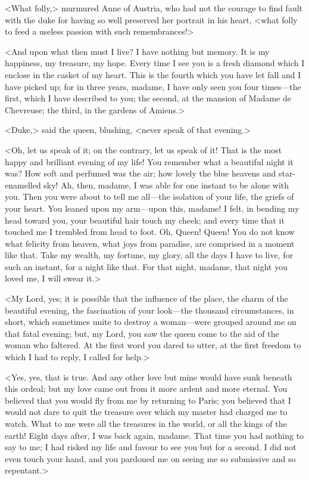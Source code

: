 <What folly,> murmured Anne of Austria, who had not the courage to find fault with the duke for having so well preserved her portrait in his heart, <what folly to feed a useless passion with such remembrances!> 

<And upon what then must I live? I have nothing but memory. It is my happiness, my treasure, my hope. Every time I see you is a fresh diamond which I enclose in the casket of my heart. This is the fourth which you have let fall and I have picked up; for in three years, madame, I have only seen you four times---the first, which I have described to you; the second, at the mansion of Madame de Chevreuse; the third, in the gardens of Amiens.> 

<Duke,> said the queen, blushing, <never speak of that evening.> 

<Oh, let us speak of it; on the contrary, let us speak of it! That is the most happy and brilliant evening of my life! You remember what a beautiful night it was? How soft and perfumed was the air; how lovely the blue heavens and star-enamelled sky! Ah, then, madame, I was able for one instant to be alone with you. Then you were about to tell me all---the isolation of your life, the griefs of your heart. You leaned upon my arm---upon this, madame! I felt, in bending my head toward you, your beautiful hair touch my cheek; and every time that it touched me I trembled from head to foot. Oh, Queen! Queen! You do not know what felicity from heaven, what joys from paradise, are comprised in a moment like that. Take my wealth, my fortune, my glory, all the days I have to live, for such an instant, for a night like that. For that night, madame, that night you loved me, I will swear it.> 

<My Lord, yes; it is possible that the influence of the place, the charm of the beautiful evening, the fascination of your look---the thousand circumstances, in short, which sometimes unite to destroy a woman---were grouped around me on that fatal evening; but, my Lord, you saw the queen come to the aid of the woman who faltered. At the first word you dared to utter, at the first freedom to which I had to reply, I called for help.> 

<Yes, yes, that is true. And any other love but mine would have sunk beneath this ordeal; but my love came out from it more ardent and more eternal. You believed that you would fly from me by returning to Paris; you believed that I would not dare to quit the treasure over which my master had charged me to watch. What to me were all the treasures in the world, or all the kings of the earth! Eight days after, I was back again, madame. That time you had nothing to say to me; I had risked my life and favour to see you but for a second. I did not even touch your hand, and you pardoned me on seeing me so submissive and so repentant.> 


